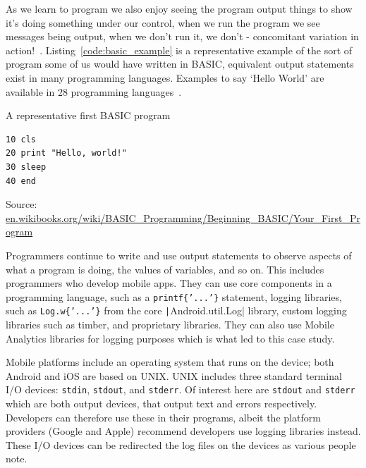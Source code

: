 
As we learn to program we also enjoy seeing the program output things to show it's doing something under our control, when we run the program we see messages being output, when we don't run it, we don't - concomitant variation in action!~\citep{mill1884system}. Listing~\ref{code:basic_example} is a representative example of the sort of program some of us would have written in BASIC, equivalent output statements exist in many programming languages. Examples to say `Hello World' are available in 28 programming languages~\citep{helloworld2017}. 

\begin{listing}
\caption{A representative first BASIC program} \label{code:basic_example}
\begin{verbatim}
10 cls
20 print "Hello, world!"
30 sleep
40 end
\end{verbatim}
Source: \href{https://en.wikibooks.org/wiki/BASIC_Programming/Beginning_BASIC/Your_First_Program}{en.wikibooks.org/wiki/BASIC\_Programming/Beginning\_BASIC/Your\_First\_Program}
\end{listing}

Programmers continue to write and use output statements to observe aspects of what a program is doing, the values of variables, and so on. This includes programmers who develop mobile apps. They can use core components in a programming language, such as a \texttt{printf\{'...'\}} statement, logging libraries, such as \texttt{Log.w\{'...'\}} from the core \texttt|Android.util.Log|
library, custom logging libraries such as timber, and proprietary libraries. They can also use Mobile Analytics libraries for logging purposes which is what led to this case study.

Mobile platforms include an operating system that runs on the device; both Android and iOS are based on UNIX. UNIX includes three standard terminal I/O devices: \texttt{stdin}, \texttt{stdout}, and \texttt{stderr}. Of interest here are \texttt{stdout} and \texttt{stderr} which are both output devices, that output text and errors respectively. Developers can therefore use these in their programs, albeit the platform providers (Google and Apple) recommend developers use logging libraries instead. These I/O devices can be redirected the log files on the devices as various people note.

